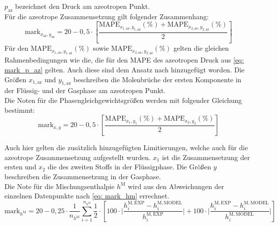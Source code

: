 \documentclass[../thesis.tex]{subfiles}
\begin{document}
$ p_\mathrm{az} $ bezeichnet den Druck am azeotropen Punkt.
\\

Für die azeotrope Zusammensetzung gilt folgender Zusammenhang:
\begin{equation}
\mathrm{mark}_{x_\mathrm{az},y_\mathrm{az}} = 20 - 0,5 \cdot \left[
	\dfrac{\mathrm{MAPE}_{x_{1,\mathrm{az}},y_{1,\mathrm{az}}}(\%) + \mathrm{MAPE}_{x_{2,\mathrm{az}},y_{2,\mathrm{az}}}(\%)}{2}
\right]
\end{equation}
Für den $ \mathrm{MAPE}_{x_{1,\mathrm{az}},y_{1,\mathrm{az}}}(\%) $ sowie $ \mathrm{MAPE}_{x_{2,\mathrm{az}},y_{2,\mathrm{az}}}(\%) $ gelten die gleichen Rahmenbedingungen wie die, die für den MAPE des azeotropen Druck aus \autoref{eq: mark_p_az} gelten. Auch diese sind dem Ansatz nach \cite{jaubert2020benchmark} hinzugefügt worden. Die Größen $ x_{1,\mathrm{az}} $ und $ y_{1,\mathrm{az}} $ beschreiben die Molenbrüche der ersten Komponente in der Flüssig- und der Gasphase am azeotropen Punkt. 
\\

Die Noten für die Phasengleichgewichtsgrößen werden mit folgender Gleichung bestimmt:
\begin{equation}
	\mathrm{mark}_{x,y} = 20 - 0,5 \cdot \left[
		\dfrac{\mathrm{MAPE}_{x_1,y_1}(\%) + \mathrm{MAPE}_{x_2,y_2}(\%)}{2}
	\right]
\end{equation}

Auch hier gelten die zusätzlich hinzugefügten Limitierungen, welche auch für die azeotrope Zusammensetzung aufgestellt wurden.
$x_1$ ist die Zusammensetzung der ersten und $x_2$ die des zweiten Stoffs in der Flüssigphase. Die Größen $ y $ beschreiben die Zusammensetzung in der Gasphase.
\\

Die Note für die Mischungsenthalpie $ h^{\mathrm{M}} $ wird aus den Abweichungen der einzelnen Datenpunkte nach \autoref{eq: mark_hm} errechnet.
\begin{equation}
\mathrm{mark}_{h^{\mathrm{M}}} = 20 - 0,25 \cdot \dfrac{1}{n_{h^{\mathrm{M}}}} \sum_{i=1}^{n_{h^{\mathrm{M}}}}
	\dfrac{1}{2} \cdot \left[
		100 \cdot \biggl|
			\dfrac{h_i^{\mathrm{M,EXP}}-h_i^{\mathrm{M,MODEL}}}{h_i^{\mathrm{M,EXP}}} 
			\biggl| 
			+ 100 \cdot \biggl| \dfrac{h_i^{\mathrm{M,EXP}}-h_i^{\mathrm{M,MODEL}}}{h_i^{\mathrm{M,MODEL}}}
		\biggl|
	\right]
\label{eq: mark_hm}
\end{equation}
\end{document}
